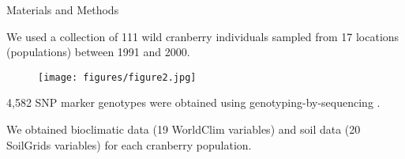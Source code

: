 \documentclass[final]{beamer}
\newlength{\onecolwid}
\begin{document}
\begin{frame}[t]
\begin{columns}[t]
\begin{column}{\onecolwid}
%
%
%
%
%



\begin{block}{Materials and Methods}

We used a collection of 111 wild cranberry individuals sampled from 17 locations (populations) between 1991 and 2000.


\begin{figure}
  \begin{center}
    \texttt{[image: figures/figure2.jpg]}
  \end{center}
\end{figure}

\vspace{1cm}

4,582 SNP marker genotypes were obtained using genotyping-by-sequencing \cite{Diaz-Garcia2020}.


\vspace{1cm}

We obtained bioclimatic data (19 WorldClim \cite{Hijmans2005} variables) and soil data (20 SoilGrids \cite{Hengl2014} variables) for each cranberry population.



\end{block}
\end{column}
\end{columns}
\end{frame}
\end{document}
